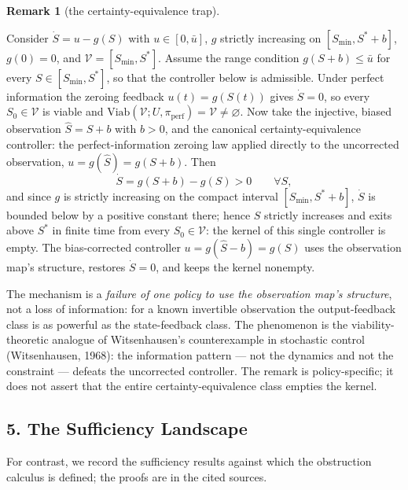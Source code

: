 \documentclass[10pt,twocolumn]{article}
\theoremstyle{definition}
\newtheorem{remark}{Remark}
\begin{document}
\begin{remark}[the certainty-equivalence trap]\label{rem:ce-trap}

Consider \(\dot S = u - g(S)\) with \(u \in [0, \bar u]\), \(g\) strictly
increasing on \([S_{\min}, S^* + b]\), \(g(0) = 0\), and
\(\mathcal{V} = [S_{\min}, S^*]\). Assume the range condition
\(g(S + b) \le \bar u\) for every \(S \in [S_{\min}, S^*]\), so that the
controller below is admissible. Under perfect information the zeroing
feedback \(u(t) = g(S(t))\) gives \(\dot S = 0\), so every
\(S_0 \in \mathcal{V}\) is viable and
\(\mathrm{Viab}(\mathcal{V}; U, \pi_{\mathrm{perf}}) = \mathcal{V} \neq \varnothing\).
Now take the injective, biased observation \(\hat S = S + b\) with
\(b > 0\), and the canonical certainty-equivalence controller: the
perfect-information zeroing law applied directly to the uncorrected
observation, \(u = g(\hat S) = g(S + b)\). Then
\[\dot S = g(S + b) - g(S) > 0 \qquad \forall S,\]
and since \(g\) is strictly increasing on the compact interval
\([S_{\min}, S^* + b]\), \(\dot S\) is bounded below by a positive
constant there; hence \(S\) strictly increases and exits above \(S^*\) in
finite time from every \(S_0 \in \mathcal{V}\): the kernel of this single
controller is empty. The bias-corrected controller
\(u = g(\hat S - b) = g(S)\) uses the observation map's structure, restores
\(\dot S = 0\), and keeps the kernel nonempty.

The mechanism is a \emph{failure of one policy to use the observation
map's structure}, not a loss of information: for a known invertible
observation the output-feedback class is as powerful as the
state-feedback class. The phenomenon is the viability-theoretic analogue
of Witsenhausen's counterexample in stochastic control (Witsenhausen,
1968): the information pattern --- not the dynamics and not the
constraint --- defeats the uncorrected controller. The remark is
policy-specific; it does not assert that the entire certainty-equivalence
class empties the kernel.

\end{remark}





\subsection{5. The Sufficiency Landscape}\label{the-sufficiency-landscape-cited}

For contrast, we record the sufficiency results against which the obstruction calculus is defined; the proofs are in the cited sources.
\end{document}
